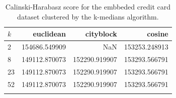\begin{table}[ht!]
    \centering
  \begin{tabular}{lrrr}
\toprule
$k$ &      euclidean &      cityblock &         cosine \\
\midrule
2  &  154686.549909 &            NaN &  153253.248913 \\
8  &  149112.870073 &  152290.919907 &  153293.566791 \\
23 &  149112.870073 &  152290.919907 &  153293.566791 \\
52 &  149112.870073 &  152290.919907 &  153293.566791 \\
\bottomrule \\
\end{tabular}

    \caption{Calinski-Harabasz score for the embbeded credit card dataset clustered by the k-medians algorithm.}
    \label{tab:ce_ch_km}
\end{table}
